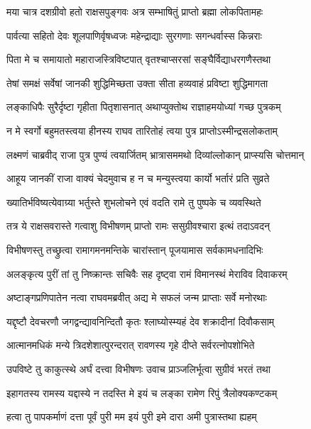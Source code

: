 \twolineshloka
{मया चात्र दशग्रीवो हतो राक्षसपुङ्गवः}
{अत्र सम्भाषितुं प्राप्तो ब्रह्मा लोकपितामहः}%

\twolineshloka
{पार्वत्या सहितो देवः शूलपाणिर्वृषध्वजः}
{महेन्द्राद्याः सुरगणाः सगन्धर्वास्स किन्नराः}%

\twolineshloka
{पिता मे च समायातो महाराजस्त्रिविष्टपात्}
{वृतश्चाप्सरसां सङ्घैर्विद्याधरगणैस्तथा}%

\twolineshloka
{तेषां समक्षं सर्वेषां जानकी शुद्धिमिच्छता}
{उक्ता सीता हव्यवाहं प्रविष्टा शुद्धिमागता}%

\twolineshloka
{लङ्काधिपैः सुरैर्दृष्टा गृहीता पितृशासनात्}
{अथाप्युक्तोथ राज्ञाहमयोध्यां गच्छ पुत्रकम्}%

\twolineshloka
{न मे स्वर्गो बहुमतस्त्वया हीनस्य राघव}
{तारितोहं त्वया पुत्र प्राप्तोऽस्मीन्द्रसलोकताम्}%

\twolineshloka
{लक्ष्मणं चाब्रवीद् राजा पुत्र पुण्यं त्वयार्जितम्}
{भ्रात्रासममथो दिव्यांल्लोकान् प्राप्स्यसि चोत्तमान्}%

\twolineshloka
{आहूय जानकीं राजा वाक्यं चेदमुवाच ह}
{न च मन्युस्त्वया कार्यो भर्तारं प्रति सुव्रते}%

\twolineshloka
{ख्यातिर्भविष्यत्येवाग्र्या भर्तुस्ते शुभलोचने}
{एवं वदति रामे तु पुष्पके च व्यवस्थिते}%

\twolineshloka
{तत्र ये राक्षसवरास्ते गत्वाशु विभीषणम्}
{प्राप्तो रामः ससुग्रीवश्चारा इत्थं तदाऽवदन्}%

\twolineshloka
{विभीषणस्तु तच्छ्रुत्वा रामागमनमन्तिके}
{चारांस्तान् पूजयामास सर्वकामधनादिभिः}%

\twolineshloka
{अलङ्कृत्य पुरीं तां तु निष्क्रान्तः सचिवैः सह}
{दृष्ट्वा रामं विमानस्थं मेराविव दिवाकरम्}%

\twolineshloka
{अष्टाङ्गप्रणिपातेन नत्वा राघवमब्रवीत्}
{अद्य मे सफलं जन्म प्राप्ताः सर्वे मनोरथाः}%

\twolineshloka
{यद्दृष्टौ देवचरणौ जगद्वन्द्यावनिन्दितौ}
{कृतः श्लाघ्योस्म्यहं देव शक्रादीनां दिवौकसाम्}%

\twolineshloka
{आत्मानमधिकं मन्ये त्रिदशेशात्पुरन्दरात्}
{रावणस्य गृहे दीप्ते सर्वरत्नोपशोभिते}%

\twolineshloka
{उपविष्टे तु काकुत्स्थे अर्घं दत्त्वा विभीषणः}
{उवाच प्राञ्जलिर्भूत्वा सुग्रीवं भरतं तथा}%

\twolineshloka
{इहागतस्य रामस्य यद्दास्ये न तदस्ति मे}
{इयं च लङ्का रामेण रिपुं त्रैलोक्यकण्टकम्}%

\twolineshloka
{हत्वा तु पापकर्माणं दत्ता पूर्वं पुरी मम}
{इयं पुरी इमे दारा अमी पुत्रास्तथा ह्यहम्}%

